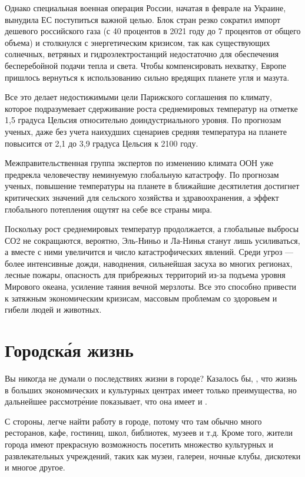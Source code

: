 Однако специальная военная операция России, начатая в феврале на Украине, вынудила ЕС поступиться важной целью. Блок стран резко сократил импорт дешевого российского газа (с 40 процентов в 2021 году до 7 процентов от общего объема) и столкнулся с энергетическим кризисом, так как существующих солнечных, ветряных и гидроэлектростанций недостаточно для обеспечения бесперебойной подачи тепла и света. Чтобы компенсировать нехватку, Европе пришлось вернуться к использованию сильно вредящих планете угля и мазута.

Все это делает недостижимыми цели Парижского соглашения по климату, которое подразумевает сдерживание роста среднемировых температур на отметке 1,5 градуса Цельсия относительно доиндустриального уровня. По прогнозам ученых, даже без учета наихудших сценариев средняя температура на планете повысится от 2,1 до 3,9 градуса Цельсия к 2100 году.

Межправительственная группа экспертов по изменению климата ООН уже предрекла человечеству неминуемую глобальную катастрофу. По прогнозам ученых, повышение температуры на планете в ближайшие десятилетия достигнет критических значений для сельского хозяйства и здравоохранения, а эффект глобального потепления ощутят на себе все страны мира.

Поскольку рост среднемировых температур продолжается, а глобальные выбросы СО2 не сокращаются, вероятно, Эль-Ниньо и Ла-Нинья станут лишь усиливаться, а вместе с ними увеличится и число катастрофических явлений. Среди угроз — более интенсивные дожди, наводнения, сильнейшая засуха во многих регионах, лесные пожары, опасность для прибрежных территорий из-за подъема уровня Мирового океана, усиление таяния вечной мерзлоты. Все это способно привести к затяжным экономическим кризисам, массовым проблемам со здоровьем и гибели людей и животных.

\section{Городск\'{а}я жизнь}
Вы никогда не думали о последствиях жизни в городе? Казалось бы, , что жизнь в больших экономических и культурных центрах имеет только преимущества, но дальнейшее рассмотр\'{е}ние показывает, что она имеет и .

С  стороны, легче найти работу в городе, потому что там обычно много ресторанов, кафе, гостиниц, школ, библиотек, музеев и т.д. Кроме того, жители города имеют прекрасную возможность посетить множество культурных и развлекательных учреждений, таких как музеи, галереи, ночные клубы, дискотеки и многое другое.

